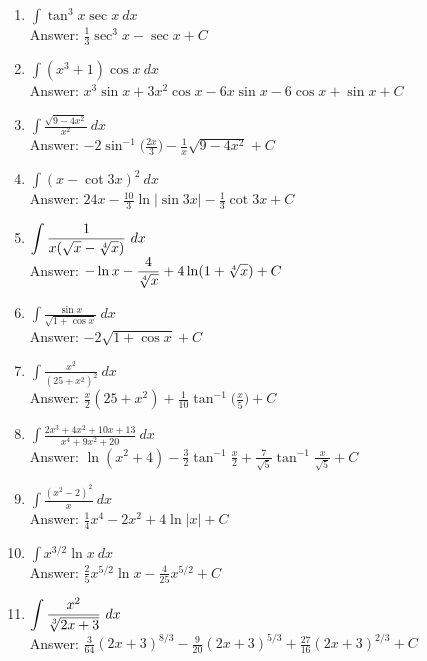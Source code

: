 \documentclass[11pt]{report}
\newcommand{\ds}{\displaystyle}
\begin{document}
\begin{enumerate}
\item $\ds \int \tan^3 x \sec x~dx$\\
Answer: $\ds \frac{1}{3}\sec^3 x  - \sec x +C$\\

\item $\ds \int (x^3+1)\cos x~dx$\\
Answer: $\ds x^3 \sin x + 3x^2 \cos x - 6x \sin x -6 \cos x + \sin x+C$\\

\item $\ds \int \frac{\sqrt{9-4x^2}}{x^2}~dx$\\
Answer: $\ds -2\sin^{-1} \bigl(\frac{2x}{3}\bigr) -\frac{1}{x}\sqrt{9-4x^2}+C$\\

\item $\ds \int (x- \cot 3x)^2~dx$\\
Answer: $\ds 24x -\frac{10}{3} \ln |\sin 3x| -\frac{1}{3}\cot 3x+C$\\

\item $\ds \int \frac{1}{x(\sqrt{x}-\root 4 \of x)}~dx$\\
Answer: $\ds -\ln x -\frac{4}{\root 4 \of x} +4\ln (1+\root 4 \of x)+C$\\

\item $\ds \int \frac{\sin x}{\sqrt{1+\cos x}}~dx$\\
Answer: $\ds-2\sqrt{1+\cos x} +C$\\

\item $\ds \int \frac{x^2}{(25+x^2)^2}~dx$\\
Answer: $\ds \frac{x}{2}(25+x^2) + \frac{1}{10}\tan^{-1}\bigl(\frac{x}{5}\bigr) +C$\\

\item $\ds \int \frac{2x^3+4x^2+10x+13}{x^4+9x^2+20}~dx$\\
Answer: $\ds \ln (x^2+4) - \frac{3}{2} \tan^{-1} \frac{x}{2}+\frac{7}{\sqrt 5} \tan^{-1} \frac{x}{\sqrt 5} +C$\\

\item $\ds \int \frac{(x^2-2)^2}{x}~dx$\\
Answer: $\ds \frac{1}{4}x^4 -2x^2 +4 \ln|x|+C$\\

\item $\ds \int x^{3/2}\ln x~dx$\\
Answer: $\ds \frac{2}{5}x^{5/2}\ln x -\frac{4}{25}x^{5/2}+C$\\

\item $\ds \int \frac{x^2}{\root 3 \of{2x+3}}~dx$\\
Answer: $\ds \frac{3}{64}(2x+3)^{8/3} -\frac{9}{20}(2x+3)^{5/3}+\frac{27}{16}(2x+3)^{2/3}+C$\\




\end{enumerate}
\end{document}
